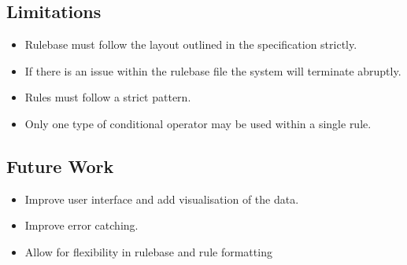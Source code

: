 \documentclass{article}
\begin{document}
\subsection{Limitations}
\begin{itemize}
  \item Rulebase must follow the layout outlined in the specification strictly.
  \item If there is an issue within the rulebase file the system will terminate abruptly.
  \item Rules must follow a strict pattern.
  \item Only one type of conditional operator may be used within a single rule.
\end{itemize}
\subsection{Future Work}
\begin{itemize}
  \item Improve user interface and add visualisation of the data.
  \item Improve error catching.
  \item Allow for flexibility in rulebase and rule formatting
\end{itemize}
\end{document}
